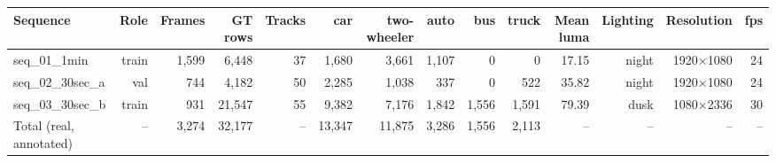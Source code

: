 \begin{tabular}{lrrrrrrrrrrrrr}
\toprule
Sequence & Role & Frames & GT rows & Tracks & car & two-wheeler & auto & bus & truck & Mean luma & Lighting & Resolution & fps \\
\midrule
seq\_01\_1min & train & 1,599 & 6,448 & 37 & 1,680 & 3,661 & 1,107 & 0 & 0 & 17.15 & night & 1920×1080 & 24 \\
seq\_02\_30sec\_a & val & 744 & 4,182 & 50 & 2,285 & 1,038 & 337 & 0 & 522 & 35.82 & night & 1920×1080 & 24 \\
seq\_03\_30sec\_b & train & 931 & 21,547 & 55 & 9,382 & 7,176 & 1,842 & 1,556 & 1,591 & 79.39 & dusk & 1080×2336 & 30 \\
Total (real, annotated) & -- & 3,274 & 32,177 & -- & 13,347 & 11,875 & 3,286 & 1,556 & 2,113 & -- & -- & -- & -- \\
\bottomrule
\end{tabular}
